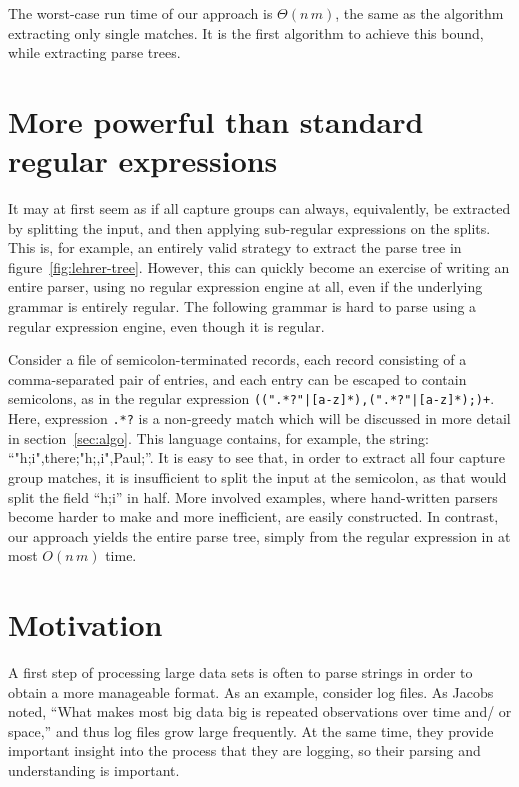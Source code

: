 \documentclass[11pt,a4paper,twoside,openright]{Thesis}
\theoremstyle{definition}
\newcommand{\Figref}[1]{figure~\ref{fig:#1}}
\newcommand{\Secref}[1]{section~\ref{sec:#1}}
\newcommand{\seclabel}[1]{\label{sec:#1}}
\begin{document}
The worst-case run time of our approach is $\Theta(n\,m)$, the same as the
algorithm extracting only single matches. It is the first algorithm to achieve
this bound, while extracting parse trees.

\section{More powerful than standard regular expressions}
\seclabel{power}
It may at first seem as if all capture groups can always, equivalently,
be extracted by splitting the input, and then applying sub-regular
expressions on the splits.  This is, for example, an entirely valid
strategy to extract the parse tree in \Figref{lehrer-tree}.  However,
this can quickly become an exercise of writing an entire parser,
using no regular expression engine at all, even if the underlying
grammar is entirely regular.  The following grammar is hard to parse
using a regular expression engine, even though it is regular.

Consider a file of semicolon-terminated records, each record consisting
of a comma-separated pair of entries, and each entry can be escaped
to contain semicolons, as in the regular expression
\texttt{((".*?"|[a-z]*),(".*?"|[a-z]*);)+}. Here, expression
\texttt{.*?} is a non-greedy match which will be discussed in more
detail in \Secref{algo}.  This language contains, for example, the
string: ``"h;i",there;"h;,i",Paul;''.  It is easy to see that, in
order to extract all four capture group matches, it is insufficient
to split the input at the semicolon, as that would split the field
``h;i'' in half.  More involved examples, where hand-written parsers
become harder to make and more inefficient, are easily constructed.
In contrast, our approach yields the entire parse tree, simply from
the regular expression in at most $O(n\,m)$ time.

\section{Motivation}

A first step of processing large data sets is often to parse strings in order
to obtain a more manageable format. As an example, consider log files.  As
Jacobs\cite{Jaco09a} noted, ``What makes most big data big is repeated
observations over time and/ or space,'' and thus log files grow large
frequently. At the same time, they provide important insight into the process
that they are logging, so their parsing and understanding is important.
\end{document}
